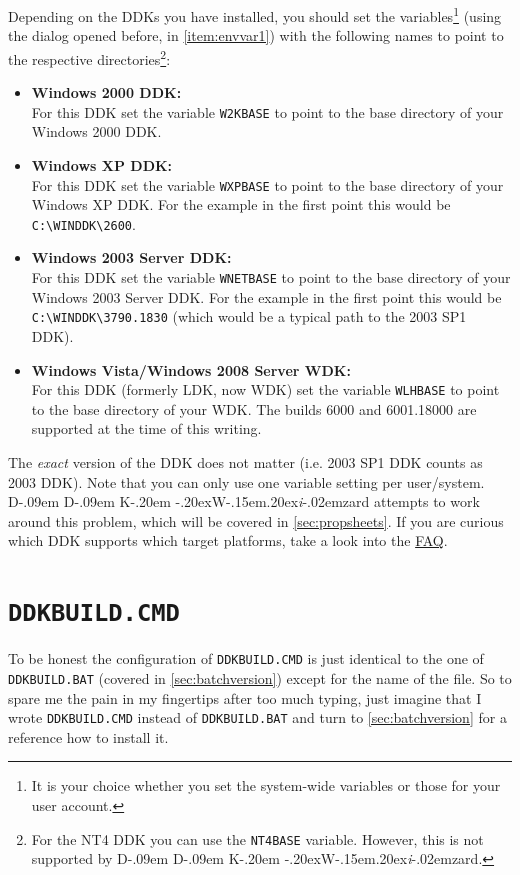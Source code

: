 \documentclass[a4paper,titlepage]{report}
\def\ddkwiz{D\kern-.09em D\kern-.09em K\kern-.20em \raise-.20ex\hbox{W}\kern-.15em\raise.20ex\hbox{\it{i}}\kern-.02em{zard}}
\begin{document}
\begin{enumerate}
    Depending on the DDKs you have installed, you should set the variables\footnote{It is your
    choice whether you set the system-wide variables or those for your user account.} (using
    the dialog opened before, in \autoref{item:envvar1}) with the following names to point to the
    respective directories\footnote{For the NT4 DDK you can use the \texttt{NT4BASE} variable.
    However, this is not supported by \ddkwiz{}.}:
    \begin{itemize}
        \item
          \textbf{Windows 2000 DDK:}\\
            For this DDK set the variable \texttt{W2KBASE} to point to the base directory of your
            Windows 2000 DDK.
        \item
          \textbf{Windows XP DDK:}\\
            For this DDK set the variable \texttt{WXPBASE} to point to the base directory of your
            Windows XP DDK. For the example in the first point this would be \verb+C:\WINDDK\2600+.
        \item
          \textbf{Windows 2003 Server DDK:}\\
            For this DDK set the variable \texttt{WNETBASE} to point to the base directory of your
            Windows 2003 Server DDK. For the example in the first point this would be \verb+C:\WINDDK\3790.1830+
            (which would be a typical path to the 2003 SP1 DDK).
        \item
          \textbf{Windows Vista/Windows 2008 Server WDK:}\\
            For this DDK (formerly LDK, now WDK) set the variable \texttt{WLHBASE} to point to the base
            directory of your WDK. The builds 6000 and 6001.18000 are supported at the time of this writing.
    \end{itemize}
    The \emph{exact} version of the DDK does not matter (i.e. 2003 SP1 DDK counts as 2003 DDK). Note that you
    can only use one variable setting per user/system. \ddkwiz{} attempts to work around this
    problem, which will be covered in \autoref{sec:propsheets}. If you are curious which
    DDK supports which target platforms, take a look into the \hyperref[cha:faq]{FAQ}.
\end{enumerate}
\section{\texttt{DDKBUILD.CMD}}
\label{sec:ntscriptversion}
To be honest the configuration of \texttt{DDKBUILD.CMD} is just identical to the one of
\texttt{DDKBUILD.BAT} (covered in \autoref{sec:batchversion}) except for the name of the file.
So to spare me the pain in my fingertips after too much typing, just imagine that I
wrote \texttt{DDKBUILD.CMD} instead of \texttt{DDKBUILD.BAT} and turn to \autoref{sec:batchversion}
for a reference how to install it.
\end{document}
